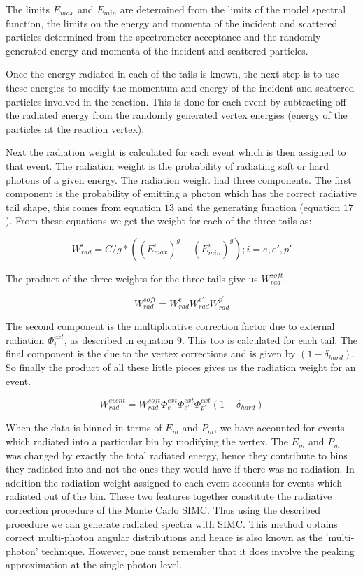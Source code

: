 The limits $E_{max}$ and $E_{min}$ are determined from the limits of the model spectral function, the limits on the energy and momenta of the incident and scattered particles determined from the spectrometer acceptance and the randomly generated energy and momenta of the incident and scattered particles.

Once the energy radiated in each of the tails is known, the next step is to use these energies to modify the momentum and energy of the incident and scattered particles involved in the reaction. This is done for each event by subtracting off the radiated energy from the randomly generated vertex energies (energy of the particles at the reaction vertex). 

Next the radiation weight is calculated for each event which is then assigned
to that event. The radiation weight is the probability of radiating soft or hard photons of a given energy. The radiation weight had three components. The first component is the probability of emitting a photon which has the correct
radiative tail shape, this comes from equation $13$ and the generating function (equation $17$). From these equations we get the weight for each of the three tails as:  

\begin{equation}
W_{rad}^{i} = C/g *((E^{i}_{max})^{g} - (E^{i}_{min})^{g}); i=e,e',p' 
\end{equation}

 
The product of the three weights for the three tails give us 
$W_{rad}^{soft}$. 

\begin{equation}
W_{rad}^{soft} = W_{rad}^{e}W_{rad}^{e{'}}W_{rad}^{p^{'}}
\end{equation}

The second  component is the multiplicative correction 
factor due to external  radiation $\Phi^{ext}_{i}$, as described in equation $9$. This too is calculated for each tail. The final component is the
due to the vertex corrections and is given by $(1-\delta_{hard})$. So finally
the product of all these little pieces gives us the radiation weight for an event.

\begin{equation}
W_{rad}^{event} = W_{rad}^{soft}\Phi^{ext}_{e}\Phi^{ext}_{e'}\Phi^{ext}_{p'}(1-\delta_{hard})
\end{equation}


When the data is binned in terms of $E_{m}$ and $P_{m}$, we have  
accounted for events which radiated into a particular bin by modifying the vertex. The $E_{m}$ and $P_{m}$ was changed by exactly the total radiated energy, hence they contribute to bins they radiated into and not the ones they would have if there was no radiation. In addition the
radiation weight assigned to each event accounts for events which radiated out of the bin. These two features together constitute the radiative correction procedure of the Monte Carlo SIMC. Thus using the described procedure we can generate radiated spectra with SIMC. This method
obtains correct multi-photon angular distributions and hence is also known as 
the 'multi-photon' technique. However, one must remember that it does involve 
the peaking approximation at the single photon level. 

